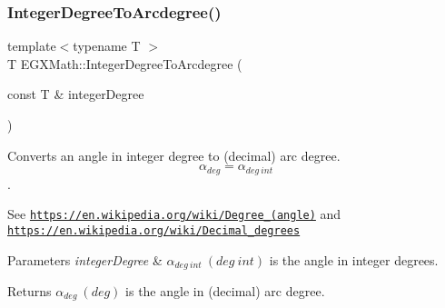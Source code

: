 \subsubsection{\texorpdfstring{Integer\+Degree\+To\+Arcdegree()}{IntegerDegreeToArcdegree()}}
{\footnotesize\ttfamily template$<$typename T $>$ \\
T E\+G\+X\+Math\+::\+Integer\+Degree\+To\+Arcdegree (\begin{DoxyParamCaption}\item[{const T \&}]{integer\+Degree }\end{DoxyParamCaption})}



Converts an angle in integer degree to (decimal) arc degree. \[\alpha_{deg}=\alpha_{deg\ int}\]. 

See \href{https://en.wikipedia.org/wiki/Degree_(angle)}{\tt https\+://en.\+wikipedia.\+org/wiki/\+Degree\+\_\+(angle)} and \href{https://en.wikipedia.org/wiki/Decimal_degrees}{\tt https\+://en.\+wikipedia.\+org/wiki/\+Decimal\+\_\+degrees} 
\begin{DoxyParams}{Parameters}
{\em integer\+Degree} & $\alpha_{deg\ int}\ (deg\ int)$ is the angle in integer degrees. \\
\hline
\end{DoxyParams}
\begin{DoxyReturn}{Returns}
$\alpha_{deg}\ (deg)$ is the angle in (decimal) arc degree. 
\end{DoxyReturn}
